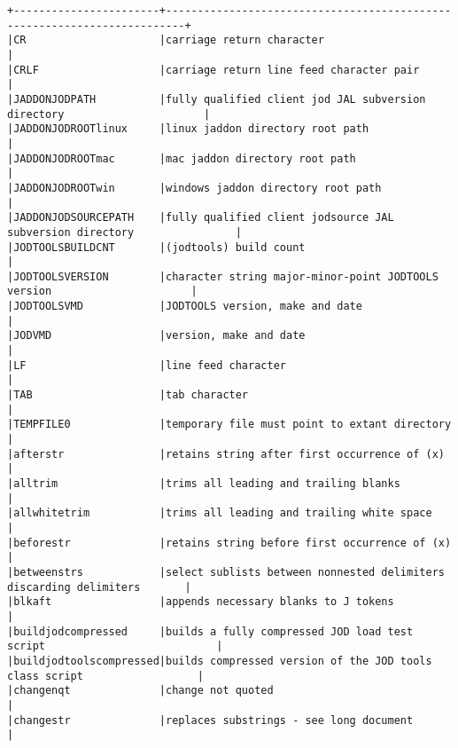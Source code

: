 \documentclass[11pt,letter,landscape]{article}
\begin{document}
    \begin{Verbatim}[commandchars=\\\{\}]
+-----------------------+-------------------------------------------------------------------------+
|CR                     |carriage return character                                                |
|CRLF                   |carriage return line feed character pair                                 |
|JADDONJODPATH          |fully qualified client jod JAL subversion directory                      |
|JADDONJODROOTlinux     |linux jaddon directory root path                                         |
|JADDONJODROOTmac       |mac jaddon directory root path                                           |
|JADDONJODROOTwin       |windows jaddon directory root path                                       |
|JADDONJODSOURCEPATH    |fully qualified client jodsource JAL subversion directory                |
|JODTOOLSBUILDCNT       |(jodtools) build count                                                   |
|JODTOOLSVERSION        |character string major-minor-point JODTOOLS version                      |
|JODTOOLSVMD            |JODTOOLS version, make and date                                          |
|JODVMD                 |version, make and date                                                   |
|LF                     |line feed character                                                      |
|TAB                    |tab character                                                            |
|TEMPFILE0              |temporary file must point to extant directory                            |
|afterstr               |retains string after first occurrence of (x)                             |
|alltrim                |trims all leading and trailing blanks                                    |
|allwhitetrim           |trims all leading and trailing white space                               |
|beforestr              |retains string before first occurrence of (x)                            |
|betweenstrs            |select sublists between nonnested delimiters discarding delimiters       |
|blkaft                 |appends necessary blanks to J tokens                                     |
|buildjodcompressed     |builds a fully compressed JOD load test script                           |
|buildjodtoolscompressed|builds compressed version of the JOD tools class script                  |
|changenqt              |change not quoted                                                        |
|changestr              |replaces substrings - see long document                                  |

\end{Verbatim}
\end{document}

